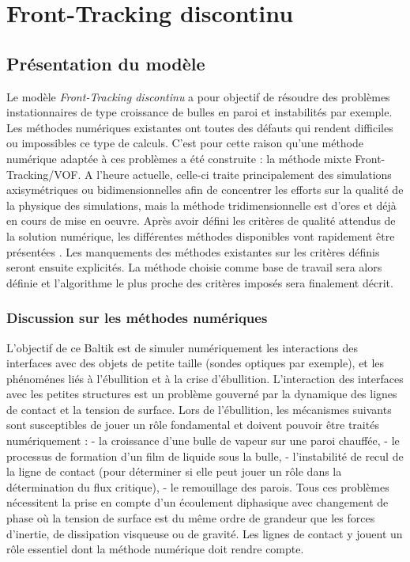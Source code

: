 \newpage
{}
\chapter{\label{sec:FTD}Front-Tracking discontinu}

\section{Pr\'esentation du mod\`ele}
Le mod\`ele \textit{Front-Tracking discontinu} a pour objectif de r\'esoudre des probl\`emes instationnaires de type croissance de bulles en paroi et instabilit\'es par exemple. Les m\'ethodes num\'eriques existantes ont toutes des d\'efauts qui rendent difficiles ou impossibles ce type de calculs. C'est pour cette raison qu'une m\'ethode num\'erique adapt\'ee \`a ces probl\`emes a \'et\'e construite : la m\'ethode mixte Front-Tracking/VOF. A l'heure actuelle, celle-ci traite principalement des simulations axisym\'etriques ou bidimensionnelles afin de concentrer les efforts sur la qualit\'e de la physique des simulations, mais la m\'ethode tridimensionnelle est d'ores et d\'ej\`a en cours de mise en oeuvre.
Apr\`es avoir d\'efini les crit\`eres de qualit\'e attendus de la solution num\'erique, les diff\'erentes m\'ethodes disponibles vont rapidement \^etre pr\'esent\'ees . Les manquements des m\'ethodes existantes sur les crit\`eres d\'efinis seront ensuite explicit\'es. La m\'ethode choisie comme base de travail sera alors d\'efinie et l'algorithme le plus proche des crit\`eres impos\'es sera finalement d\'ecrit.

\subsection{Discussion sur les m\'ethodes num\'eriques}

L'objectif de ce Baltik est de simuler num\'eriquement les interactions des interfaces avec des objets de petite taille (sondes optiques par exemple), et les ph\'enom\'enes li\'es à l'\'ebullition et \`a la crise d'\'ebullition. L'interaction des interfaces avec les petites structures est un problème gouvern\'e par la dynamique des lignes de contact et la tension de surface.
Lors de l'\'ebullition, les m\'ecanismes suivants sont susceptibles de jouer un r\^ole fondamental et doivent pouvoir \^etre trait\'es num\'eriquement :
- la croissance d'une bulle de vapeur sur une paroi chauff\'ee,
- le processus de formation d'un film de liquide sous la bulle,
- l'instabilit\'e de recul de la ligne de contact (pour d\'eterminer si elle peut jouer un r\^ole dans la d\'etermination du flux critique),
- le remouillage des parois.
Tous ces probl\`emes n\'ecessitent la prise en compte d'un \'ecoulement diphasique avec changement de phase o\`u la tension de surface est du m\^eme ordre de grandeur que les forces d'inertie, de dissipation visqueuse ou de gravit\'e. Les lignes de contact y jouent un r\^ole essentiel dont la m\'ethode num\'erique doit rendre compte.

